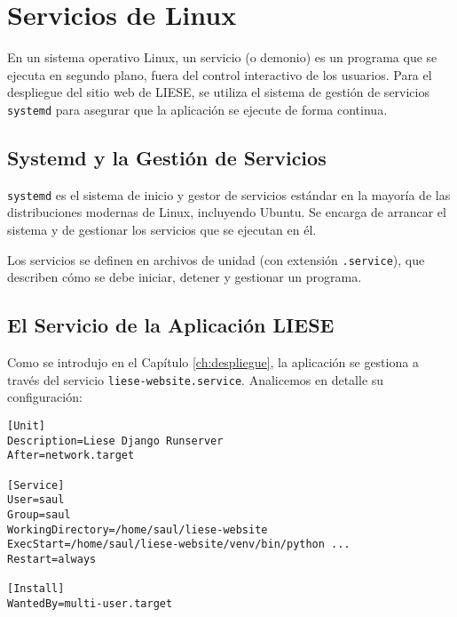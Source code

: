 \chapter{Servicios de Linux}
\label{ch:servicios_linux}

En un sistema operativo Linux, un servicio (o demonio) es un programa que se ejecuta en segundo plano, fuera del control interactivo de los usuarios. Para el despliegue del sitio web de LIESE, se utiliza el sistema de gestión de servicios \texttt{systemd} para asegurar que la aplicación se ejecute de forma continua.

\section{Systemd y la Gestión de Servicios}

\texttt{systemd} es el sistema de inicio y gestor de servicios estándar en la mayoría de las distribuciones modernas de Linux, incluyendo Ubuntu. Se encarga de arrancar el sistema y de gestionar los servicios que se ejecutan en él.

Los servicios se definen en archivos de unidad (con extensión \texttt{.service}), que describen cómo se debe iniciar, detener y gestionar un programa.

\section{El Servicio de la Aplicación LIESE}

Como se introdujo en el Capítulo \ref{ch:despliegue}, la aplicación se gestiona a través del servicio \texttt{liese-website.service}. Analicemos en detalle su configuración:

\begin{verbatim}
[Unit]
Description=Liese Django Runserver
After=network.target

[Service]
User=saul
Group=saul
WorkingDirectory=/home/saul/liese-website
ExecStart=/home/saul/liese-website/venv/bin/python ...
Restart=always

[Install]
WantedBy=multi-user.target
\end{verbatim}


